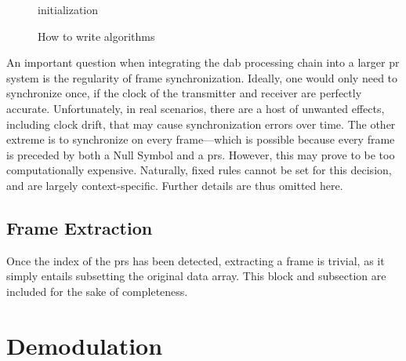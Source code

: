 \documentclass[class=report,11pt,crop=false]{standalone}
\begin{document}
\begin{figure}[ht]
    \centering
    \captionsetup{type=figure}
    \begin{minipage}{.6\linewidth}
      \begin{algorithm}[H]
        \caption{How to write algorithms \label{alg:test}}

        \SetAlgoLined
        
        
        initialization\;
        

      \end{algorithm}
    \end{minipage}
\end{figure}

An important question when integrating the \gls{dab} processing chain into a larger \gls{pr} system is the regularity of frame synchronization. Ideally, one would only need to synchronize once, if the clock of the transmitter and receiver are perfectly accurate. Unfortunately, in real scenarios, there are a host of unwanted effects, including clock drift, that may cause synchronization errors over time. The other extreme is to synchronize on every frame---which is possible because every frame is preceded by both a Null Symbol and a \gls{prs}. However, this may prove to be too computationally expensive. Naturally, fixed rules cannot be set for this decision, and are largely context-specific. Further details are thus omitted here.

\subsection{Frame Extraction \label{subsect:dab-proc_frame-extract}}
Once the index of the \gls{prs} has been detected, extracting a frame is trivial, as it simply entails subsetting the original data array. This block and subsection are included for the sake of completeness.


\section{Demodulation \label{sect:dab-proc_demodulate}}
\end{document}
